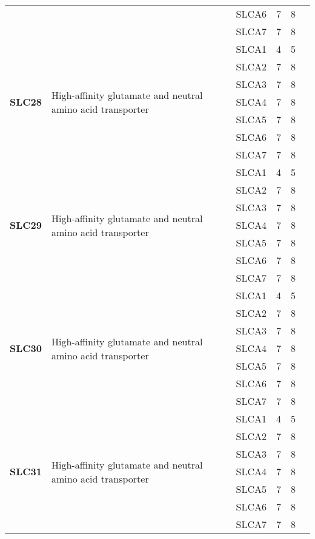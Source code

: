 \documentclass[12pt]{report}
\begin{document}
\begin{center}
\begin{longtable}{|p{1.5cm}|p{3.2cm}|p{1.9cm}|p{1.65cm}|p{3cm}|p{3cm}|}
\cline{3-6}
&&SLCA6&7 & 8&\\ 
\cline{3-6}
&&SLCA7&7 & 8&\\ 
\hline
\multirow{7}{1.5cm}{\textbf{SLC28}} & \multirow{7}{4cm}{High-affinity glutamate and neutral amino acid transporter} & SLCA1 & 4 & 5\\ 
\cline{3-6}
&&SLCA2&7 & 8&\\ 
\cline{3-6}
&&SLCA3&7 & 8&\\ 
\cline{3-6}
&&SLCA4&7 & 8&\\ 
\cline{3-6}
&&SLCA5&7 & 8&\\ 
\cline{3-6}
&&SLCA6&7 & 8&\\ 
\cline{3-6}
&&SLCA7&7 & 8&\\ 
\hline
\multirow{7}{1.5cm}{\textbf{SLC29}} & \multirow{7}{4cm}{High-affinity glutamate and neutral amino acid transporter} & SLCA1 & 4 & 5\\ 
\cline{3-6}
&&SLCA2&7 & 8&\\ 
\cline{3-6}
&&SLCA3&7 & 8&\\ 
\cline{3-6}
&&SLCA4&7 & 8&\\ 
\cline{3-6}
&&SLCA5&7 & 8&\\ 
\cline{3-6}
&&SLCA6&7 & 8&\\ 
\cline{3-6}
&&SLCA7&7 & 8&\\ 
\hline
\multirow{7}{1.5cm}{\textbf{SLC30}} & \multirow{7}{4cm}{High-affinity glutamate and neutral amino acid transporter} & SLCA1 & 4 & 5\\ 
\cline{3-6}
&&SLCA2&7 & 8&\\ 
\cline{3-6}
&&SLCA3&7 & 8&\\ 
\cline{3-6}
&&SLCA4&7 & 8&\\ 
\cline{3-6}
&&SLCA5&7 & 8&\\ 
\cline{3-6}
&&SLCA6&7 & 8&\\ 
\cline{3-6}
&&SLCA7&7 & 8&\\ 
\hline
\multirow{7}{1.5cm}{\textbf{SLC31}} & \multirow{7}{4cm}{High-affinity glutamate and neutral amino acid transporter} & SLCA1 & 4 & 5\\ 
\cline{3-6}
&&SLCA2&7 & 8&\\ 
\cline{3-6}
&&SLCA3&7 & 8&\\ 
\cline{3-6}
&&SLCA4&7 & 8&\\ 
\cline{3-6}
&&SLCA5&7 & 8&\\ 
\cline{3-6}
&&SLCA6&7 & 8&\\ 
\cline{3-6}
&&SLCA7&7 & 8&\\ 

\end{longtable}
\end{center}
\end{document}
